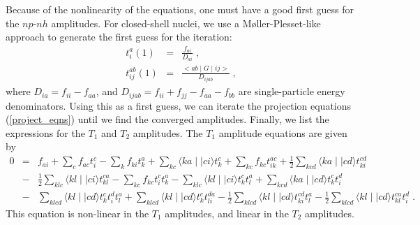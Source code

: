 \documentclass{article}
\begin{document}
Because of the nonlinearity of the equations,
one must have a good first guess for the $np$-$nh$ amplitudes. 
For closed-shell nuclei, we
use a M\o ller-Plesset-like approach to generate the first guess 
for the iteration: 
\begin{eqnarray}
t^a_i(1) &=& \frac{f_{ai}}{D_{ai}} \;, \nonumber \\ 
t^{ab}_{ij}(1) &=& \frac{<ab\mid G \mid ij>}{D_{ijab}} \;,
\label{amp_start}
\end{eqnarray}
where $D_{ia}=f_{ii}-f_{aa}$, and $D_{ijab}=f_{ii}+f_{jj}-f_{aa}-f_{bb}$
are single-particle energy denominators. 
Using this as a first guess, we can iterate the projection
equations 
(\ref{project_eqns})
until we find the converged amplitudes. Finally, we list the expressions for the 
$T_1$ and $T_2$ amplitudes.
The $T_1$ amplitude equations are given by
\begin{eqnarray}
0 & = & f_{ai} + \sum_cf_{ac}t^c_i - \sum_k f_{ki}t^a_k +  
\sum_{kc}\langle ka\mid\mid ci\rangle t^c_k + \sum_{kc}f_{kc}t^{ac}_{ik}
+\frac{1}{2}\sum_{kcd}\langle ka\mid\mid cd\rangle t^{cd}_{ki} \nonumber \\
  & - & \frac{1}{2}\sum_{klc}\langle kl\mid\mid ci \rangle t^{ca}_{kl}
-\sum_{kc}f_{kc}t^c_it^a_k -\sum_{klc}\langle kl\mid\mid ci\rangle t^c_k t^a_l
+\sum_{kcd} \langle ka\mid\mid cd \rangle t^c_k t^d_i  \nonumber \\
  & - & \sum_{klcd}\langle kl\mid\mid cd\rangle t^c_kt^d_it^a_l
+ \sum_{klcd}\langle kl\mid\mid cd\rangle t^c_kt^{da}_{li}
- \frac{1}{2} \sum_{klcd}\langle kl\mid\mid cd\rangle t^{cd}_{ki}t^{a}_{l}
- \frac{1}{2} \sum_{klcd}\langle kl\mid\mid cd\rangle t^{ca}_{kl}t^{d}_{i}\;.
\label{t1_eqn}
\end{eqnarray}
This equation is non-linear in the $T_1$ amplitudes, and linear in
the $T_2$ amplitudes. 
\end{document}
